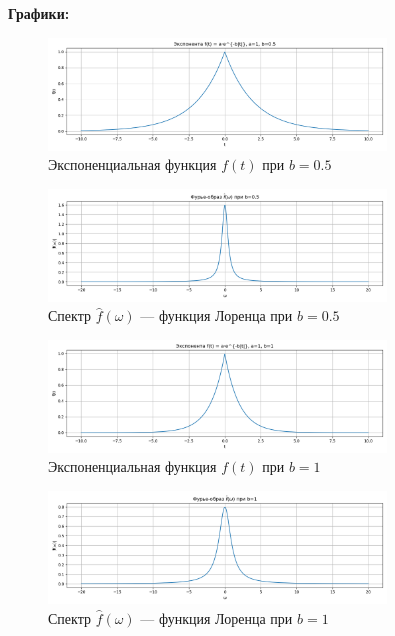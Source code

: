 \textbf{Графики:}

\begin{figure}[H]
    \centering
    \includegraphics[width=0.8\textwidth]{exp_function_b0.5.png}
    \caption{Экспоненциальная функция $f(t)$ при $b = 0.5$}
\end{figure}

\begin{figure}[H]
    \centering
    \includegraphics[width=0.8\textwidth]{exp_spectrum_b0.5.png}
    \caption{Спектр $\hat{f}(\omega)$ — функция Лоренца при $b = 0.5$}
\end{figure}

\begin{figure}[H]
    \centering
    \includegraphics[width=0.8\textwidth]{exp_function_b1.png}
    \caption{Экспоненциальная функция $f(t)$ при $b = 1$}
\end{figure}

\begin{figure}[H]
    \centering
    \includegraphics[width=0.8\textwidth]{exp_spectrum_b1.png}
    \caption{Спектр $\hat{f}(\omega)$ — функция Лоренца при $b = 1$}
\end{figure}

